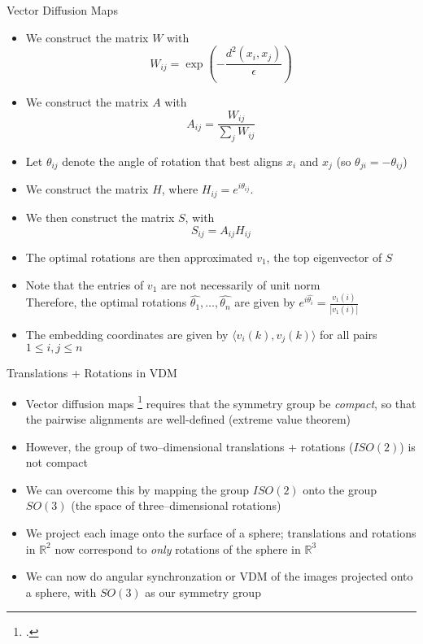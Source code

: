 \begin{frame}{Vector Diffusion Maps}

	\begin{itemize}
	\item We construct the matrix $W$ with
	        $$W_{ij} = \exp \left( -\frac{d^2 (x_i, x_j)}{\epsilon} \right) $$
	\item We construct the matrix $A$ with
	$$A_{ij} = \frac{W_{ij}}{\sum_j W_{ij}}$$
	
	 \item Let $\theta_{ij}$ denote the angle of rotation that best aligns $x_i$ and $x_j$ (so $\theta_{ji} = -\theta_{ij}$)

     \item We construct the matrix $H$, where $H_{ij} = e^{i \theta_{ij}}$.
     
     \item We then construct the matrix $S$, with
     $$S_{ij} = A_{ij} H_{ij}$$
     
     \item The optimal rotations are then approximated $v_1$, the top eigenvector of $S$

     \item Note that the entries of $v_1$ are not necessarily of unit norm\\
        Therefore, the optimal rotations $\hat{\theta_1}, \dots, \hat{\theta_n}$ are given by
        $e^{i \hat{\theta_i}} = \frac{v_1(i)}{|v_1(i)|}$

	\item The embedding coordinates are given by $\langle v_i(k), v_j(k) \rangle$ for all pairs $1 \le i, j \le n$
	
	\end{itemize}
\end{frame}

\begin{frame}{Translations + Rotations in VDM}

	\begin{itemize}
	
	\item Vector diffusion maps \footcite{singer2012vector} requires that the symmetry group be {\em compact}, so that the pairwise alignments are well-defined (extreme value theorem)
	\item However, the group of two--dimensional translations + rotations ($ISO(2)$) is not compact
	\item We can overcome this by mapping the group $ISO(2)$ onto the group $SO(3)$ (the space of three--dimensional rotations)
	\item We project each image onto the surface of a sphere; translations and rotations in $\mathbb{R}^2$ now correspond to {\em only} rotations of the sphere in $\mathbb{R}^3$
	\item We can now do angular synchronzation or VDM of the images projected onto a sphere, with $SO(3)$ as our symmetry group
	\end{itemize}
\end{frame}



